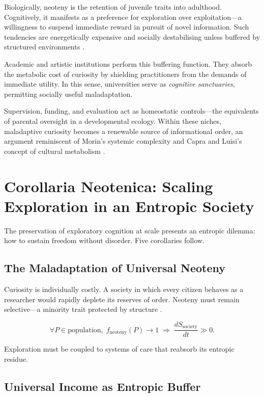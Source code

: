 \documentclass[12pt,a4paper]{article}
\begin{document}
Biologically, neoteny is the retention of juvenile traits into adulthood. 
Cognitively, it manifests as a preference for exploration over exploitation---a willingness 
to suspend immediate reward in pursuit of novel information. 
Such tendencies are energetically expensive and socially destabilising 
unless buffered by structured environments \citep{gopnik2025evolution}.

Academic and artistic institutions perform this buffering function. 
They absorb the metabolic cost of curiosity by shielding practitioners from the demands of 
immediate utility.  In this sense, universities serve as 
\textit{cognitive sanctuaries}, permitting socially useful maladaptation. 

Supervision, funding, and evaluation act as homeostatic controls---the equivalents of 
parental oversight in a developmental ecology. 
Within these niches, maladaptive curiosity becomes a renewable source of informational order,
an argument reminiscent of Morin’s systemic complexity \citep{morin2008method}
and Capra and Luisi’s concept of cultural metabolism \citep{capra2021systems}.

\section{Corollaria Neotenica: Scaling Exploration in an Entropic Society}

The preservation of exploratory cognition at scale presents an entropic dilemma:
how to sustain freedom without disorder.  
Five corollaries follow.

\subsection{The Maladaptation of Universal Neoteny}

Curiosity is individually costly.  A society in which every citizen behaves as a researcher
would rapidly deplete its reserves of order.
Neoteny must remain selective---a minority trait protected by structure
\citep{georgescu1971entropy}.

\[
\forall P \in \text{population}, \;
f_{\mathrm{neoteny}}(P)\!\to\!1
\;\Rightarrow\;
\frac{dS_{\mathrm{society}}}{dt}\!\gg\!0.
\]

Exploration must be coupled to systems of care that reabsorb its entropic residue.

\subsection{Universal Income as Entropic Buffer}
\end{document}

